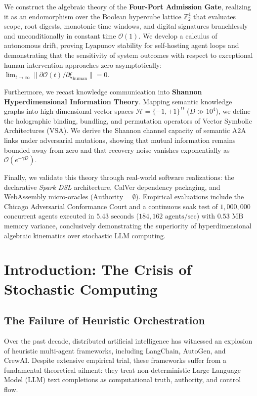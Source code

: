 \documentclass[12pt,oneside,a4paper]{book}
\theoremstyle{definition}
\theoremstyle{plain}
\theoremstyle{remark}
\begin{document}
We construct the algebraic theory of the \textbf{Four-Port Admission Gate}, realizing it as an endomorphism over the Boolean hypercube lattice $\mathbb{Z}_2^4$ that evaluates scope, root digests, monotonic time windows, and digital signatures branchlessly and unconditionally in constant time $\mathcal{O}(1)$. We develop a calculus of autonomous drift, proving Lyapunov stability for self-hosting agent loops and demonstrating that the sensitivity of system outcomes with respect to exceptional human intervention approaches zero asymptotically: $\lim_{t \to \infty} \|\partial \mathcal{O}(t)/\partial \xi_{\text{human}}\| = 0$.

Furthermore, we recast knowledge communication into \textbf{Shannon Hyperdimensional Information Theory}. Mapping semantic knowledge graphs into high-dimensional vector spaces $\mathcal{H} = \{-1, +1\}^D$ ($D \gg 10^4$), we define the holographic binding, bundling, and permutation operators of Vector Symbolic Architectures (VSA). We derive the Shannon channel capacity of semantic A2A links under adversarial mutations, showing that mutual information remains bounded away from zero and that recovery noise vanishes exponentially as $\mathcal{O}(e^{-\gamma D})$.

Finally, we validate this theory through real-world software realizations: the declarative \emph{Spark DSL} architecture, CalVer dependency packaging, and WebAssembly micro-oracles ($\text{Authority} = \emptyset$). Empirical evaluations include the Chicago Adversarial Conformance Court and a continuous soak test of $1,000,000$ concurrent agents executed in $5.43\text{ seconds}$ ($184,162\text{ agents/sec}$) with $0.53\text{ MB}$ memory variance, conclusively demonstrating the superiority of hyperdimensional algebraic kinematics over stochastic LLM computing.

\tableofcontents

\mainmatter

\chapter{Introduction: The Crisis of Stochastic Computing}

\section{The Failure of Heuristic Orchestration}
Over the past decade, distributed artificial intelligence has witnessed an explosion of heuristic multi-agent frameworks, including LangChain, AutoGen, and CrewAI. Despite extensive empirical trial, these frameworks suffer from a fundamental theoretical ailment: they treat non-deterministic Large Language Model (LLM) text completions as computational truth, authority, and control flow. 
\end{document}
